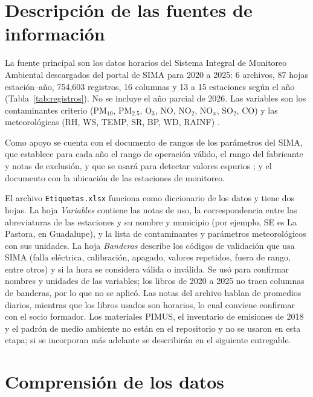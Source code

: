 \documentclass[11pt,letterpaper]{article}
\begin{document}
\section{Descripci\'on de las fuentes de informaci\'on}
La fuente principal son los datos horarios del Sistema Integral de Monitoreo Ambiental descargados del portal de SIMA para 2020 a 2025: 6 archivos, 87 hojas estaci\'on--a\~no, 754,603 registros, 16 columnas y 13 a 15 estaciones seg\'un el a\~no (Tabla~\ref{tab:registros}). No se incluye el a\~no parcial de 2026. Las variables son los contaminantes criterio (PM$_{10}$, PM$_{2.5}$, O$_3$, NO, NO$_2$, NO$_x$, SO$_2$, CO) y las meteorol\'ogicas (RH, WS, TEMP, SR, BP, WD, RAINF) \cite{sima_ranges}.

Como apoyo se cuenta con el documento de rangos de los par\'ametros del SIMA, que establece para cada a\~no el rango de operaci\'on v\'alido, el rango del fabricante y notas de exclusi\'on, y que se usar\'a para detectar valores espurios \cite{sima_ranges}; y el documento con la ubicaci\'on de las estaciones de monitoreo.

El archivo \texttt{Etiquetas.xlsx} funciona como diccionario de los datos y tiene dos hojas. La hoja \textit{Variables} contiene las notas de uso, la correspondencia entre las abreviaturas de las estaciones y su nombre y municipio (por ejemplo, SE es La Pastora, en Guadalupe), y la lista de contaminantes y par\'ametros meteorol\'ogicos con sus unidades. La hoja \textit{Banderas} describe los c\'odigos de validaci\'on que usa SIMA (falla el\'ectrica, calibraci\'on, apagado, valores repetidos, fuera de rango, entre otros) y si la hora se considera v\'alida o inv\'alida. Se us\'o para confirmar nombres y unidades de las variables; los libros de 2020 a 2025 no traen columnas de banderas, por lo que no se aplic\'o. Las notas del archivo hablan de promedios diarios, mientras que los libros usados son horarios, lo cual conviene confirmar con el socio formador. Los materiales PIMUS, el inventario de emisiones de 2018 y el padr\'on de medio ambiente no est\'an en el repositorio y no se usaron en esta etapa; si se incorporan m\'as adelante se describir\'an en el siguiente entregable.

\section{Comprensi\'on de los datos}
\end{document}
